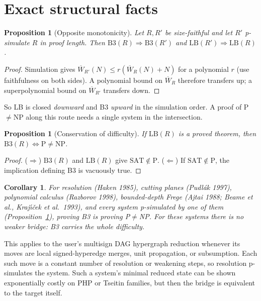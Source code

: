 \documentclass[11pt]{article}
\newtheorem{proposition}[theorem]{Proposition}
\newtheorem{corollary}[theorem]{Corollary}
\theoremstyle{definition}
\theoremstyle{remark}
\begin{document}
\section{Exact structural facts}
\begin{proposition}[Opposite monotonicity]\label{closure}
Let $R,R'$ be size-faithful and let $R'$ p-simulate $R$ in proof length. Then $\mathrm{B3}(R)\Rightarrow\mathrm{B3}(R')$ and $\mathrm{LB}(R')\Rightarrow\mathrm{LB}(R)$.
\end{proposition}
\begin{proof}
Simulation gives $\overline W_{R'}(N)\le r(\overline W_{R}(N)+N)$ for a polynomial $r$ (use faithfulness on both sides). A polynomial bound on $\overline W_R$ therefore transfers up; a superpolynomial bound on $\overline W_{R'}$ transfers down.
\end{proof}
So LB is closed \emph{downward} and B3 \emph{upward} in the simulation order. A proof of P$\ne$NP along this route needs a single system in the intersection.

\begin{proposition}[Conservation of difficulty]\label{conservation}
If $\mathrm{LB}(R)$ is a proved theorem, then $\mathrm{B3}(R)\iff \mathrm{P}\neq\mathrm{NP}$.
\end{proposition}
\begin{proof}
($\Rightarrow$) $\mathrm{B3}(R)$ and $\mathrm{LB}(R)$ give $\mathrm{SAT}\notin\mathrm{P}$. ($\Leftarrow$) If $\mathrm{SAT}\notin\mathrm{P}$, the implication defining B3 is vacuously true.
\end{proof}
\begin{corollary}\label{weak}
For resolution (Haken 1985), cutting planes (Pudl\'ak 1997), polynomial calculus (Razborov 1998), bounded-depth Frege (Ajtai 1988; Beame et al., Kraj\'{\i}\v{c}ek et al.\ 1993), and every system p-simulated by one of them (Proposition~\ref{closure}), proving B3 \emph{is} proving P$\ne$NP. For these systems there is no weaker bridge: B3 carries the whole difficulty.
\end{corollary}
This applies to the user's multisign DAG hypergraph reduction whenever its moves are local signed-hyperedge merges, unit propagation, or subsumption. Each such move is a constant number of resolution or weakening steps, so resolution p-simulates the system. Such a system's minimal reduced state can be shown exponentially costly on PHP or Tseitin families, but then the bridge is equivalent to the target itself.
\end{document}
